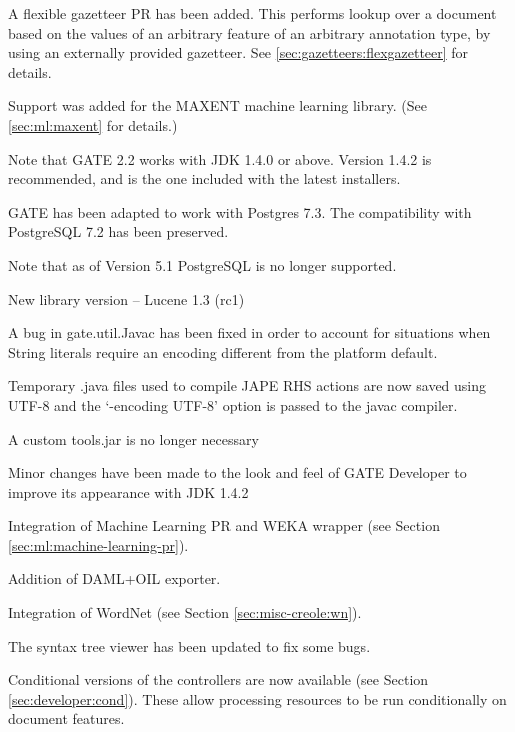 A flexible gazetteer PR has been added. This performs lookup over a
document based on the values of an arbitrary feature of an arbitrary
annotation type, by using an externally provided gazetteer. See
\ref{sec:gazetteers:flexgazetteer} for details.



Support was added for the MAXENT machine learning library. (See
\ref{sec:ml:maxent} for details.)



Note that GATE 2.2 works with JDK 1.4.0 or above. Version 1.4.2 is
recommended, and is the one included with the latest installers.

GATE has been adapted to work with Postgres 7.3. The compatibility with
PostgreSQL 7.2 has been preserved. 

Note that as of Version 5.1 PostgreSQL is no longer supported.


New library version -- Lucene 1.3 (rc1)

A bug in gate.util.Javac has been fixed in order to account for situations
when String literals require an encoding different from the platform
default.

Temporary .java files used to compile JAPE RHS actions are now saved using
UTF-8 and the `-encoding UTF-8' option is passed to the javac compiler.

A custom tools.jar is no longer necessary

Minor changes have been made to the look and feel of GATE Developer to
improve its appearance with JDK 1.4.2


Integration of Machine Learning PR and WEKA wrapper (see Section
\ref{sec:ml:machine-learning-pr}).

Addition of DAML+OIL exporter.

Integration of WordNet (see Section \ref{sec:misc-creole:wn}).

The syntax tree viewer has been updated to fix some bugs.



Conditional versions of the controllers are now available (see Section
\ref{sec:developer:cond}). These allow processing resources to be run
conditionally on document features.

